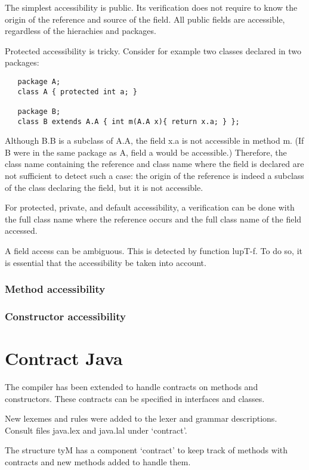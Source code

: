 \documentclass{book}
\begin{document}
The simplest accessibility is public. Its verification does not
require to know the origin of the reference and source of the field.
All public fields are accessible, regardless of the hierachies and
packages.


Protected accessibility is tricky. Consider for example two classes
declared in two packages:

\begin{verbatim}
   package A;
   class A { protected int a; }
   
   package B;
   class B extends A.A { int m(A.A x){ return x.a; } };
\end{verbatim}

Although B.B is a subclass of A.A, the field x.a is not accessible in
method m. (If B were in the same package as A, field a would be
accessible.) Therefore, the class name containing the reference and
class name where the field is declared are not sufficient to detect
such a case: the origin of the reference is indeed a subclass of the
class declaring the field, but it is not accessible.

For protected, private, and default accessibility, a verification can
be done with the full class name where the reference occurs and the
full class name of the field accessed.

A field access can be ambiguous. This is detected by function lupT-f.
To do so, it is essential that the accessibility be taken into
account. 


\subsubsection{Method accessibility}

\subsubsection{Constructor accessibility}

\section{Contract Java}

The compiler has been extended to handle contracts on methods and
constructors. These contracts can be specified in interfaces and
classes.

New lexemes and rules were added to the lexer and grammar
descriptions. Consult files java.lex and java.lal under `contract'.

The structure tyM has a component `contract' to keep track of methods
with contracts and new methods added to handle them.
\end{document}
